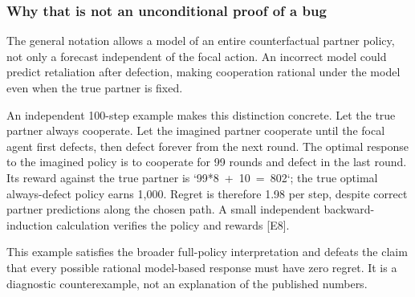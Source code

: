 \documentclass[10pt]{article}
\begin{document}
\subsubsection*{Why that is not an unconditional proof of a bug}
The general notation allows a model of an entire counterfactual partner policy, not only a forecast independent of the focal action. An incorrect model could predict retaliation after defection, making cooperation rational under the model even when the true partner is fixed.\par
An independent 100-step example makes this distinction concrete. Let the true partner always cooperate. Let the imagined partner cooperate until the focal agent first defects, then defect forever from the next round. The optimal response to the imagined policy is to cooperate for 99 rounds and defect in the last round. Its reward against the true partner is `99*8 + 10 = 802`; the true optimal always-defect policy earns 1,000. Regret is therefore 1.98 per step, despite correct partner predictions along the chosen path. A small independent backward-induction calculation verifies the policy and rewards [E8].\par
This example satisfies the broader full-policy interpretation and defeats the claim that every possible rational model-based response must have zero regret. It is a diagnostic counterexample, not an explanation of the published numbers.\par
\end{document}
